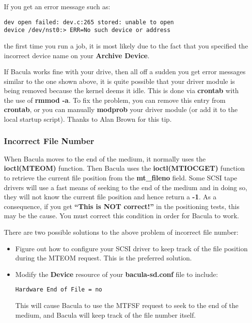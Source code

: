 If you get an error message such as: 

\footnotesize
\begin{verbatim}
dev open failed: dev.c:265 stored: unable to open
device /dev/nst0:> ERR=No such device or address
\end{verbatim}
\normalsize

the first time you run a job, it is most likely due to the fact that you
specified the incorrect device name on your {\bf Archive Device}. 

If Bacula works fine with your drive, then all off a sudden you get error
messages similar to the one shown above, it is quite possible that your driver
module is being removed because the kernel deems it idle. This is done via
{\bf crontab} with the use of {\bf rmmod -a}. To fix the problem, you can
remove this entry from {\bf crontab}, or you can manually {\bf modprob} your
driver module (or add it to the local startup script). Thanks to Alan Brown
for this tip. 
\label{IncorrectFiles}

\subsubsection*{Incorrect File Number}

When Bacula moves to the end of the medium, it normally uses the {\bf
ioctl(MTEOM)} function. Then Bacula uses the {\bf ioctl(MTIOCGET)} function to
retrieve the current file position from the {\bf mt\_fileno} field. Some SCSI
tape drivers will use a fast means of seeking to the end of the medium and in
doing so, they will not know the current file position and hence return a {\bf
-1}. As a consequence, if you get {\bf ``This is NOT correct!''} in the
positioning tests, this may be the cause. You must correct this condition in
order for Bacula to work. 

There are two possible solutions to the above problem of incorrect file
number: 

\begin{itemize}
\item Figure out how to configure your SCSI driver to  keep track of the file
   position during the MTEOM  request. This is the preferred solution.  
\item Modify the {\bf Device} resource of your {\bf bacula-sd.conf} file  to
   include:  

\footnotesize
\begin{verbatim}
Hardware End of File = no
\end{verbatim}
\normalsize

This will cause Bacula to use the MTFSF request to  seek to the end of the
medium, and Bacula will keep  track of the file number itself. 
\end{itemize}

